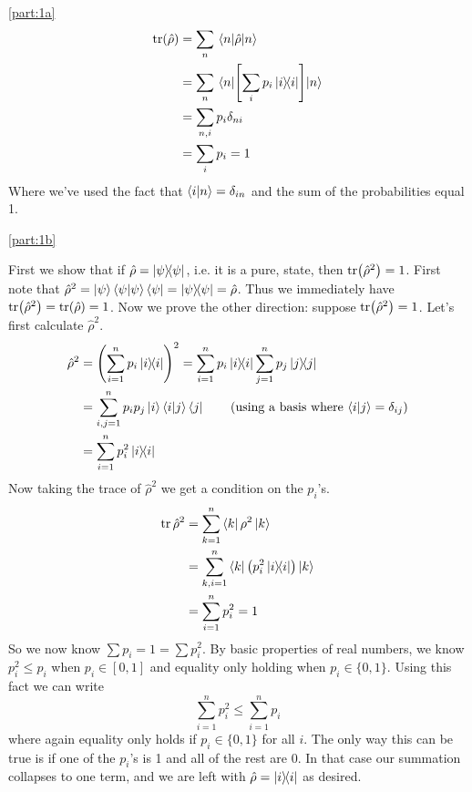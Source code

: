 \documentclass[boxes,pages]{homework}
\makeatletter
\numberwithin{@problem}{section}
\makeatother
\begin{document}
\begin{solution}
	\ref{part:1a}
	\begin{align*}
		\tr(\hat{\rho}) & = \sum_n\expval{\hat{\rho}}{n}                \\
		                & = \sum_n\expval{\qty[\sum_ip_i\ketbra{i}]}{n} \\
		                & = \sum_{n, i}p_i\delta_{ni}                   \\
		                & = \sum_i p_i = 1
	\end{align*}
	Where we've used the fact that $\braket{i}{n} = \delta_{in}$ and the sum of the probabilities equal 1.

	\ref{part:1b}


	First we show that if $\hat{\rho} = \ketbra{\psi}$, i.e. it is a pure, state, then $\tr(\hat{\rho}^2) = 1$. First note that $\hat{\rho}^2 = \ket{\psi}\braket{\psi}{\psi}\bra{\psi} = \ketbra{\psi} = \hat{\rho}$. Thus we immediately have $\tr(\hat{\rho}^2) = \tr(\hat{\rho}) = 1$.
	Now we prove the other direction: suppose $\tr(\hat{\rho}^2) = 1$. Let's first calculate $\hat{\rho}^2$.
	\begin{align*}
		\hat{\rho}^2 & = \qty(\sum_{i = 1}^n p_i\ketbra{i}{i})^2 = \sum_{i = 1}^n p_i\ketbra{i}{i}\sum_{j = 1}^n p_j\ketbra{j}{j}   \\
		             & = \sum_{i,j = 1}^n p_ip_j\ket{i}\braket{i}{j}\bra{j} \tag{using a basis where $\braket{i}{j} = \delta_{ij}$} \\
		             & = \sum_{i = 1}^n p_i^2\ketbra{i}{i}
	\end{align*}
	Now taking the trace of $\hat{\rho}^2$ we get a condition on the $p_i$'s.
	\begin{align*}
		\tr \hat{\rho}^2 & = \sum_{k = 1}^n\bra{k}\rho^2\ket{k}                     \\
		                 & = \sum_{k,i = 1}^n\bra{k}\qty(p_i^2\ketbra{i}{i})\ket{k} \\
		                 & = \sum_{i = 1}^n p_i^2 = 1
	\end{align*}
	So we now know $\sum p_i = 1 = \sum p_i^2$. By basic properties of real numbers, we know $p_i^2 \leq p_i$ when $p_i\in[0, 1]$ and equality only holding when $p_i \in\{0, 1\}$. Using this fact we can write
	\begin{equation*}
		\sum_{i = 1}^n p_i^2 \leq \sum_{i = 1}^n p_i
	\end{equation*}
	where again equality only holds if $p_i\in\{0, 1\}$ for all $i$. The only way this can be true is if one of the $p_i$'s is 1 and all of the rest are 0. In that case our summation collapses to one term, and we are left with $\hat{\rho} = \ketbra{i}$ as desired.
\end{solution}
\end{document}
